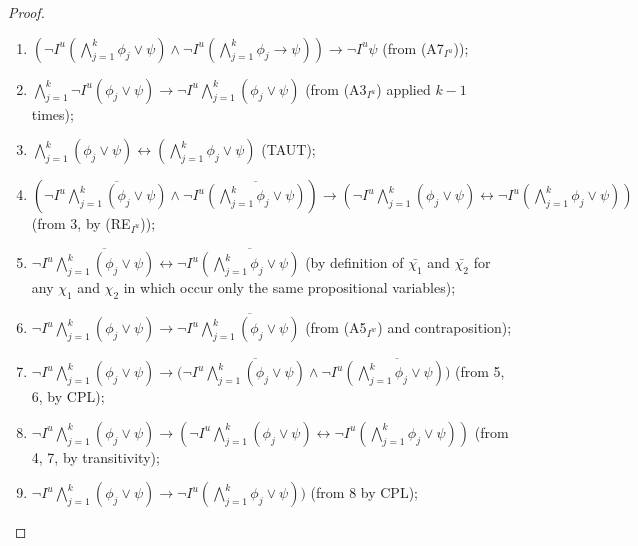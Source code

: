 \documentclass{article}
\begin{document}
\begin{proof}

\

\begin{enumerate}

\item $(\neg I^{u} (\bigwedge^{k}_{j=1} \phi_{j} \vee \psi) \wedge \neg I^{u} (\bigwedge^{k}_{j=1} \phi_{j} \rightarrow \psi)) \rightarrow \neg I^{u} \psi$ (from (A7$_{I^{u}}$));

\item $\bigwedge^{k}_{j=1}  \neg I^{u}( \phi_{j} \vee \psi) \rightarrow \neg I^{u} \bigwedge^{k}_{j=1} (\phi_{j} \vee \psi)$ (from (A3$_{I^{u}}$) applied $k-1$ times);

\item $\bigwedge^{k}_{j=1} (\phi_{j} \vee \psi) \leftrightarrow (\bigwedge^{k}_{j=1} \phi_{j}  \vee \psi)$ (TAUT);

\item $(\neg I^{u} \overline{\bigwedge^{k}_{j=1} (\phi_{j} \vee \psi)} \wedge \neg I^{u} \overline{(\bigwedge^{k}_{j=1} \phi_{j}  \vee \psi)}) \rightarrow (\neg I^{u} \bigwedge^{k}_{j=1} (\phi_{j} \vee \psi) \leftrightarrow \neg I^{u} (\bigwedge^{k}_{j=1} \phi_{j}  \vee \psi))$ (from 3, by (RE$_{I^{u}}$));

\item $\neg I^{u} \overline{\bigwedge^{k}_{j=1} (\phi_{j} \vee \psi)} \leftrightarrow \neg I^{u} \overline{(\bigwedge^{k}_{j=1} \phi_{j}  \vee \psi)}$ (by definition of $\bar{\chi_{1}}$ and $\bar{\chi_{2}}$ for any $\chi_{1}$ and $\chi_{2}$ in which occur only the same propositional variables);

\item $\neg I^{u} \bigwedge^{k}_{j=1} (\phi_{j} \vee \psi) \rightarrow \neg I^{u} \overline{\bigwedge^{k}_{j=1} (\phi_{j} \vee \psi)}$ (from (A5$_{I^{w}}$) and contraposition);

\item $\neg I^{u} \bigwedge^{k}_{j=1} (\phi_{j} \vee \psi) \rightarrow (\neg I^{u} \overline{\bigwedge^{k}_{j=1} (\phi_{j} \vee \psi)} \wedge \neg I^{u} \overline{(\bigwedge^{k}_{j=1} \phi_{j}  \vee \psi))}$ (from 5, 6, by CPL);

\item $\neg I^{u} \bigwedge^{k}_{j=1} (\phi_{j} \vee \psi) \rightarrow  (\neg I^{u} \bigwedge^{k}_{j=1} (\phi_{j} \vee \psi) \leftrightarrow \neg I^{u} (\bigwedge^{k}_{j=1} \phi_{j}  \vee \psi))$ (from 4, 7, by transitivity);

\item $\neg I^{u} \bigwedge^{k}_{j=1} (\phi_{j} \vee \psi) \rightarrow \neg I^{u} (\bigwedge^{k}_{j=1} \phi_{j}  \vee \psi))$ (from 8 by CPL);


\end{enumerate}
\end{proof}
\end{document}
